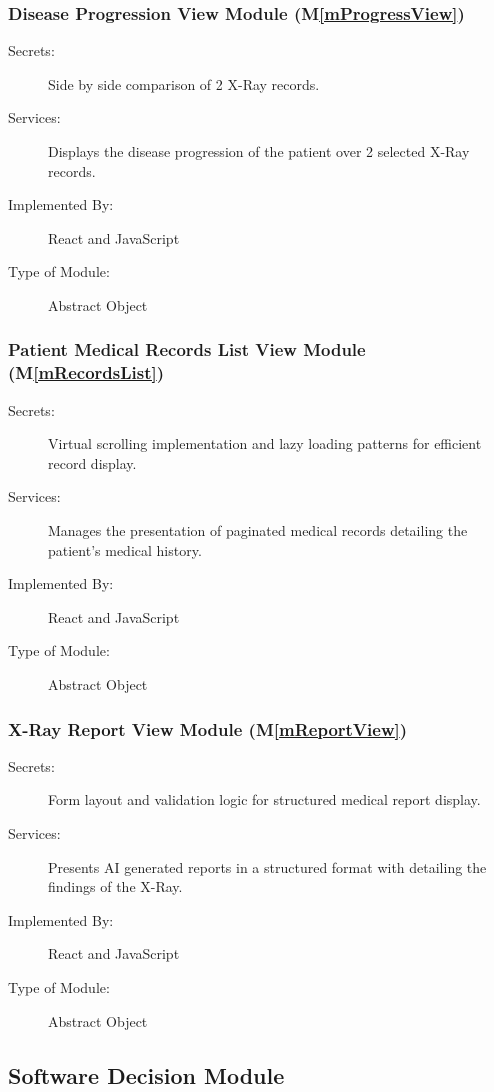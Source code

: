 \documentclass[12pt, titlepage]{article}
\newcommand{\mref}[1]{M\ref{#1}}
\begin{document}
\subsubsection{Disease Progression View Module (\mref{mProgressView})}
\begin{description}
\item[Secrets:] Side by side comparison of 2 X-Ray records.
\item[Services:] Displays the disease progression of the patient over 2 selected X-Ray records.
\item[Implemented By:] React and JavaScript
\item[Type of Module:] Abstract Object
\end{description}

\subsubsection{Patient Medical Records List View Module (\mref{mRecordsList})}
\begin{description}
\item[Secrets:] Virtual scrolling implementation and lazy loading patterns for efficient record display.
\item[Services:] Manages the presentation of paginated medical records detailing the patient's medical history.
\item[Implemented By:] React and JavaScript
\item[Type of Module:] Abstract Object
\end{description}

\subsubsection{X-Ray Report View Module (\mref{mReportView})}
\begin{description}
\item[Secrets:] Form layout and validation logic for structured medical report display.
\item[Services:] Presents AI generated reports in a structured format with detailing the findings of the X-Ray.
\item[Implemented By:] React and JavaScript
\item[Type of Module:] Abstract Object
\end{description}


\subsection{Software Decision Module}
\end{document}
